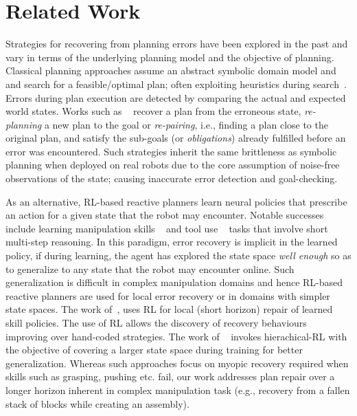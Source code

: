 \section{Related Work} \label{sec:related}
%
Strategies for recovering from planning errors have been explored in the past and vary in terms of the underlying planning model and the objective of planning. 
Classical planning approaches assume an abstract symbolic domain model and and search for a feasible/optimal plan; often exploiting heuristics during  search~\citep{belta2007symbolic}.     
%
Errors during plan execution are detected by comparing the actual and expected world states. Works such as ~\citep{bercher2014plan,saetti2022optimising,fox2006plan} recover a plan from the erroneous state, \emph{re-planning} a new plan to the goal or \emph{re-pairing}, i.e., finding a plan close to the original plan, and satisfy the sub-goals (or \emph{obligations}) already fulfilled before an error was encountered.  
%
Such strategies inherit the same brittleness as symbolic planning when deployed on real robots due to the core assumption of noise-free observations of the state; causing inaccurate error detection and goal-checking. 

As an alternative, RL-based reactive planners learn neural policies that prescribe an action for a given state that the robot may encounter.   
%
Notable successes include learning manipulation skills ~\citep{rana2023residual,kumar2023graph,ebert2018visual} and tool use ~\citep{li2020towards,wu2019imagine} tasks that involve short multi-step reasoning. 
%
In this paradigm, error recovery is implicit in the learned policy, if during learning, the agent has explored the state space \emph{well enough} so as to  generalize to any state that the robot may encounter online. 
%
Such generalization is difficult in complex manipulation domains and hence RL-based reactive planners are used for local error recovery or in domains with simpler state spaces. 
%
The work of~\citep{ryu2022confidence,vatsefficient,thananjeyan2021recovery}, uses RL for local (short horizon) repair of learned skill policies. The use of RL allows the discovery of recovery behaviours improving over hand-coded strategies. The work of ~\citep{bagaria2020option} invokes hierachical-RL with the objective of covering a larger state space during training for better generalization.   
%
Whereas such approaches focus on myopic recovery required when skills such as grasping, pushing etc. fail, our work addresses plan repair over a longer horizon inherent in complex manipulation task (e.g., recovery from a fallen stack of blocks while creating an assembly). 

